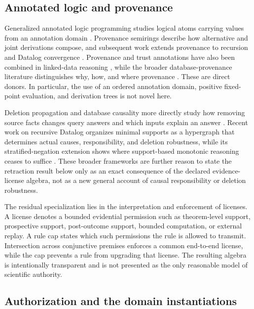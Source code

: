 \documentclass[pdflatex,sn-mathphys-num]{sn-jnl}
\begin{document}
\subsection{Annotated logic and provenance}\label{annotated-logic-and-provenance}

Generalized annotated logic programming studies logical atoms carrying values from an annotation domain \citep{kifer1992}. Provenance semirings describe how alternative and joint derivations compose, and subsequent work extends provenance to recursion and Datalog convergence \citep{green2007, bourgaux2022, abokhamis2022}. Provenance and trust annotations have also been combined in linked-data reasoning \citep{bonatti2011}, while the broader database-provenance literature distinguishes why, how, and where provenance \citep{cheney2009}. These are direct donors. In particular, the use of an ordered annotation domain, positive fixed-point evaluation, and derivation trees is not novel here.

Deletion propagation and database causality more directly study how removing source facts changes query answers and which inputs explain an answer \citep{buneman2002, meliou2010}. Recent work on recursive Datalog organizes minimal supports as a hypergraph that determines actual causes, responsibility, and deletion robustness, while its stratified-negation extension shows where support-based monotonic reasoning ceases to suffice \citep{thapa2026minimal, thapa2026stratified}. These broader frameworks are further reason to state the retraction result below only as an exact consequence of the declared evidence-license algebra, not as a new general account of causal responsibility or deletion robustness.

The residual specialization lies in the interpretation and enforcement of licenses. A license denotes a bounded evidential permission such as theorem-level support, prospective support, post-outcome support, bounded computation, or external replay. A rule cap states which such permissions the rule is allowed to transmit. Intersection across conjunctive premises enforces a common end-to-end license, while the cap prevents a rule from upgrading that license. The resulting algebra is intentionally transparent and is not presented as the only reasonable model of scientific authority.

\subsection{Authorization and the domain instantiations}\label{authorization-and-the-domain-instantiations}
\end{document}
